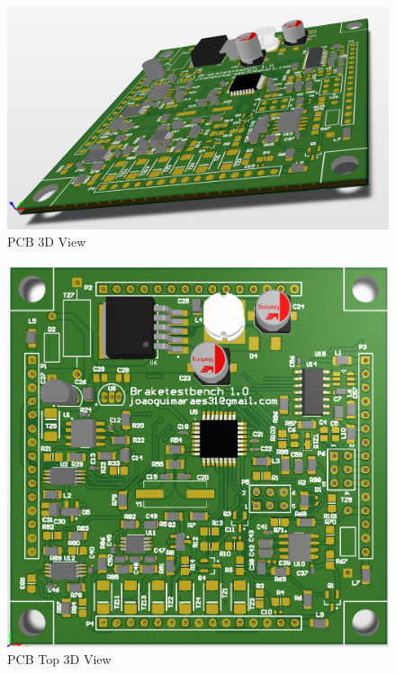 		\begin{figure}[htbp]
			\centering
			\includegraphics[scale=0.7]{figuras/fig-pcb-print-diagonal.png}
			\caption{PCB 3D View \cite{pcb-print-diagonal}}
			\label{fig:pcb-print-diagonal}
		\end{figure}

		\begin{figure}[htbp]
			\centering
			\includegraphics[scale=0.6]{figuras/fig-pcb-print-top.png}
			\caption{PCB Top 3D View \cite{pcb-print-top}}
			\label{fig:pcb-print-top}
		\end{figure}

